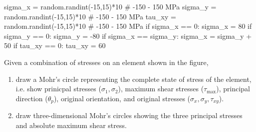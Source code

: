 \documentclass[
10pt,
a4paper,
openany,
svgnames,
]{kaobook} %
\begin{document}
\begin{exercises}
\begin{pycode}
sigma_x = random.randint(-15,15)*10 # -150 - 150 MPa
sigma_y = random.randint(-15,15)*10 # -150 - 150 MPa
tau_xy = random.randint(-15,15)*10 # -150 - 150 MPa
if sigma_x == 0: sigma_x = 80
if sigma_y == 0: sigma_y = -80
if sigma_x == sigma_y: sigma_x = sigma_y + 50
if tau_xy == 0: tau_xy = 60
\end{pycode}

  \item Given a combination of stresses on an element shown in the figure,

        \begin{enumerate}
          \item draw a Mohr's circle representing the complete state of stress of the element, i.e. show prinicpal stresses ($\sigma_{1}, \sigma_{2}$), maximum shear stresses ($\tau_{\max}$), principal direction ($\theta_{p}$), original orientation, and original stresses ($\sigma_{x}, \sigma_{y}, \tau_{xy}$).
          \item draw three-dimensional Mohr's circles showing the three principal stresses and absolute maximum shear stress.
        \end{enumerate}


\end{exercises}
\end{document}
